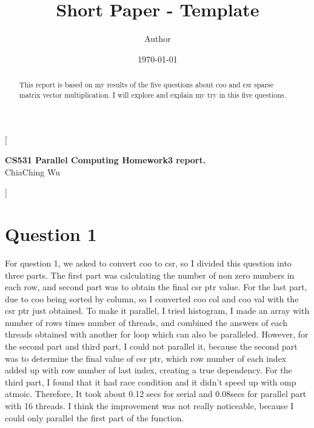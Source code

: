 \documentclass{article}
\title{Short Paper - Template}
\author{Author}
\date{\today}
\begin{document}
\twocolumn
[{
\LARGE
\textcolor{titleColor}{\textbf{CS531 Parallel Computing Homework3 report.}}\vspace{1ex}\\
\large
\textcolor{authorColor}{ChiaChing Wu}
\vspace{1ex}
\normalsize
\begin{tcolorbox}[  colback = abstractColor,
                    ,
                    width=\linewidth,
                    arc=1mm, auto outer arc,
                ]
\justifying
\begin{abstract}
    This report is based on my results of the five questions about coo and csr sparse matrix vector multiplication. I will explore and explain my try in this five questions.
\end{abstract}

\end{tcolorbox}
\vspace{1.5ex}
}]



\section{Question 1}
For question 1, we asked to convert coo to csr, so I divided this question into three parts. The first part was calculating the number of non zero numbers in each row, and second part was to obtain the final csr ptr value. For the last part, due to coo being sorted by column, so I converted coo col and coo val with the csr ptr just obtained. To make it parallel, I tried histogram, I made an array with number of rows times number of threads, and combined the answers of each threads obtained with another for loop which can also be paralleled. However, for the second part and third part, I could not parallel it, because the second part was to determine the final value of csr ptr, which row number of each index added up with row number of last index, creating a true dependency. For the third part, I found that it had race condition and it didn't speed up with omp atmoic. Therefore, It took about 0.12 secs for serial and 0.08secs for parallel part with 16 threads. I think the improvement was not really noticeable, because I could only parallel the first part of the function.  
\end{document}
